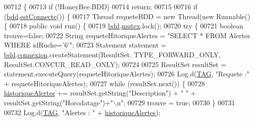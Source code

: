 \begin{DoxyCode}
00712     \{
00713         \textcolor{keywordflow}{if} (!HoneyBee.BDD)
00714             \textcolor{keywordflow}{return};
00715 
00716         \textcolor{keywordflow}{if} (\hyperlink{classfr_1_1campus_1_1laurainc_1_1honeybee_1_1_ruche_a0eb43a2b63fb83e9d5af6cd6b754c7da}{bdd}.\hyperlink{classfr_1_1campus_1_1laurainc_1_1honeybee_1_1_base_de_donnees_a735f54c2c183a595c9a9a5ba947491f5}{estConnecte}()) \{
00717             Thread requeteBDD = \textcolor{keyword}{new} Thread(\textcolor{keyword}{new} Runnable() \{
00718                 \textcolor{keyword}{public} \textcolor{keywordtype}{void} run() \{
00719                     \hyperlink{classfr_1_1campus_1_1laurainc_1_1honeybee_1_1_ruche_a0eb43a2b63fb83e9d5af6cd6b754c7da}{bdd}.\hyperlink{classfr_1_1campus_1_1laurainc_1_1honeybee_1_1_base_de_donnees_a0dd6f285a11459c086adea6080bed282}{mutex}.lock();
00720                     \textcolor{keywordflow}{try} \{
00721                         \textcolor{keywordtype}{boolean} trouve=\textcolor{keyword}{false};
00722                         String requeteHitoriqueAlertes = \textcolor{stringliteral}{"SELECT * FROM Alertes WHERE idRuche='6'"};
00723                         Statement statement = \hyperlink{classfr_1_1campus_1_1laurainc_1_1honeybee_1_1_ruche_a0eb43a2b63fb83e9d5af6cd6b754c7da}{bdd}.\hyperlink{classfr_1_1campus_1_1laurainc_1_1honeybee_1_1_base_de_donnees_a358899633f17b8cd00dd2c4cfdd40abe}{connexion}.createStatement(ResultSet.
      TYPE\_FORWARD\_ONLY, ResultSet.CONCUR\_READ\_ONLY);
00724 
00725                         ResultSet resultSet = statement.executeQuery(requeteHitoriqueAlertes);
00726                         Log.d(\hyperlink{classfr_1_1campus_1_1laurainc_1_1honeybee_1_1_ruche_a44739cbb0fa7451c1edc240a3f51c257}{TAG}, \textcolor{stringliteral}{"Requete :"} + requeteHitoriqueAlertes);
00727                         \textcolor{keywordflow}{while} (resultSet.next()) \{
00728                             \hyperlink{classfr_1_1campus_1_1laurainc_1_1honeybee_1_1_ruche_a8befaea028a782bb0cec7b4934210183}{historiqueAlertes} += resultSet.getString(\textcolor{stringliteral}{"Description"}) + \textcolor{stringliteral}{" "} 
      + resultSet.getString(\textcolor{stringliteral}{"Horodatage"})+\textcolor{stringliteral}{"\(\backslash\)n"};
00729                             trouve = \textcolor{keyword}{true};
00730                         \}
00731 
00732                         Log.d(\hyperlink{classfr_1_1campus_1_1laurainc_1_1honeybee_1_1_ruche_a44739cbb0fa7451c1edc240a3f51c257}{TAG}, \textcolor{stringliteral}{"Alertes : "} + \hyperlink{classfr_1_1campus_1_1laurainc_1_1honeybee_1_1_ruche_a8befaea028a782bb0cec7b4934210183}{historiqueAlertes});

\end{DoxyCode}
